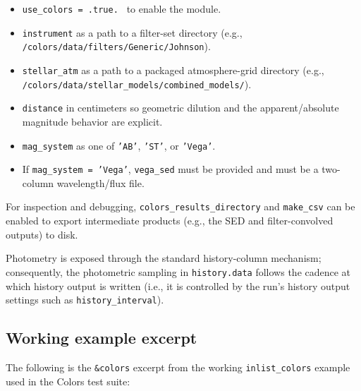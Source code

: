 \documentclass[linenumbers,apj,twocolumn, floatfix]{aastex701}
\begin{document}
\begin{itemize} \item \texttt{use\_colors = .true.
	      }
	      to enable the module.
	\item \texttt{instrument}
	      as a path to a filter-set directory (e.g., \texttt{/colors/data/filters/Generic/Johnson}).
	\item \texttt{stellar\_atm}
	      as a path to a packaged atmosphere-grid directory (e.g., \texttt{/colors/data/stellar\_models/combined\_models/}).
	\item \texttt{distance}
	      in centimeters so geometric dilution and the apparent/absolute magnitude behavior are explicit.
	\item \texttt{mag\_system}
	      as one of \texttt{'AB'}, \texttt{'ST'}, or \texttt{'Vega'}.
	\item If \texttt{mag\_system = 'Vega'}, \texttt{vega\_sed}
	      must be provided and must be a two-column wavelength/flux file.
\end{itemize}

For inspection and debugging, \texttt{colors\_results\_directory} and \texttt{make\_csv} can be enabled to export intermediate products (e.g., the SED and filter-convolved outputs) to disk.

Photometry is exposed through the standard history-column mechanism; consequently, the photometric sampling in \texttt{history.data} follows the cadence at which history output is written (i.e., it is controlled by the run's history output settings such as \texttt{history\_interval}).

\subsection{Working example excerpt}

The following is the \texttt{\&colors} excerpt from the working \texttt{inlist\_colors} example used in the Colors test suite: 
\end{document}

